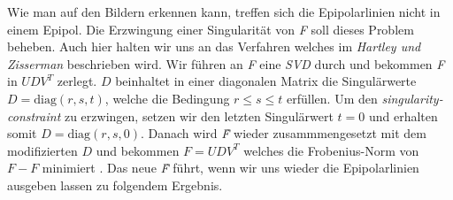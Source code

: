 Wie man auf den Bildern erkennen kann, treffen sich die Epipolarlinien nicht in einem Epipol. Die Erzwingung einer Singularität von \textit{F} soll dieses Problem beheben. Auch hier halten wir uns an das Verfahren welches im \textit{Hartley und Zisserman} \cite{HZ} beschrieben wird. Wir führen an \textit{F} eine \textit{SVD} durch und bekommen \textit{F} in \textit{\ensuremath{UDV^T}} zerlegt. \ensuremath{D} beinhaltet in einer diagonalen Matrix die Singulärwerte \ensuremath{D = \text{diag}(r,s,t)}, welche die Bedingung \ensuremath{r \leq s \leq t } erfüllen. Um den \textit{singularity-constraint} zu erzwingen, setzen wir den letzten Singulärwert \ensuremath{t = 0} und erhalten somit \ensuremath{D = \text{diag}(r,s,0)}. Danach wird \textit{\^F} wieder zusammmengesetzt mit dem modifizierten \ensuremath{D} und bekommen \ensuremath{\textit{\^F} = UDV^T} welches die Frobenius-Norm von \ensuremath{F-\textit{\^F}} minimiert \cite{HZ}. Das neue \textit{\^F} führt, wenn wir uns wieder die Epipolarlinien ausgeben lassen zu folgendem Ergebnis.



